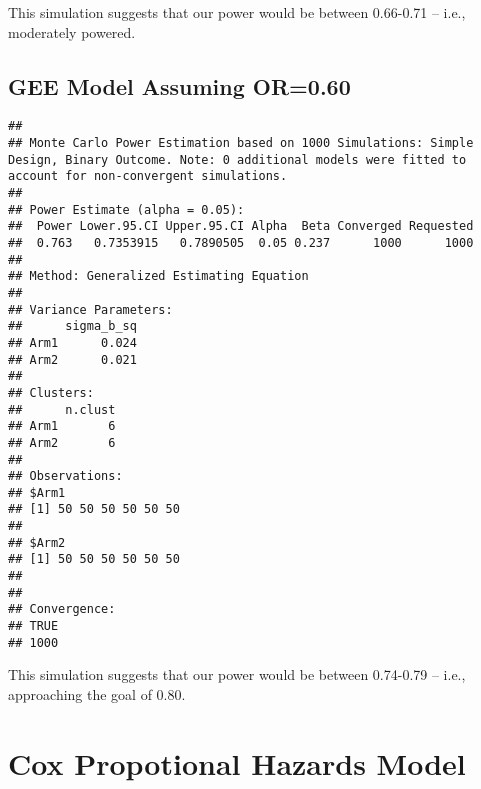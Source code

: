 \documentclass[
]{article}
\newenvironment{Shaded}{\begin{snugshade}}{\end{snugshade}}
\newcommand{\CommentTok}[1]{\textcolor[rgb]{0.56,0.35,0.01}{\textit{#1}}}
\newcommand{\KeywordTok}[1]{\textcolor[rgb]{0.13,0.29,0.53}{\textbf{#1}}}
\newcommand{\NormalTok}[1]{#1}
\newcommand{\StringTok}[1]{\textcolor[rgb]{0.31,0.60,0.02}{#1}}
\begin{document}
This simulation suggests that our power would be between 0.66-0.71 --
i.e., moderately powered.

\hypertarget{gee-model-assuming-or0.60}{%
\subsection{GEE Model Assuming
OR=0.60}\label{gee-model-assuming-or0.60}}

\begin{Shaded}
\end{Shaded}

\begin{verbatim}
## 
## Monte Carlo Power Estimation based on 1000 Simulations: Simple Design, Binary Outcome. Note: 0 additional models were fitted to account for non-convergent simulations.
## 
## Power Estimate (alpha = 0.05):
##  Power Lower.95.CI Upper.95.CI Alpha  Beta Converged Requested
##  0.763   0.7353915   0.7890505  0.05 0.237      1000      1000
## 
## Method: Generalized Estimating Equation 
## 
## Variance Parameters:
##      sigma_b_sq
## Arm1      0.024
## Arm2      0.021
## 
## Clusters:
##      n.clust
## Arm1       6
## Arm2       6
## 
## Observations:
## $Arm1
## [1] 50 50 50 50 50 50
## 
## $Arm2
## [1] 50 50 50 50 50 50
## 
## 
## Convergence:
## TRUE 
## 1000
\end{verbatim}

This simulation suggests that our power would be between 0.74-0.79 --
i.e., approaching the goal of 0.80.

\hypertarget{cox-propotional-hazards-model}{%
\section{Cox Propotional Hazards
Model}\label{cox-propotional-hazards-model}}
\end{document}
